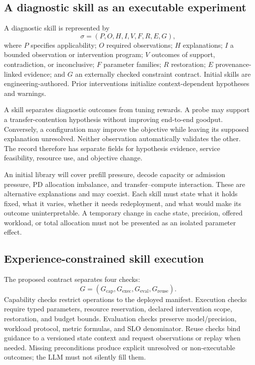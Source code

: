 \documentclass[preprint,12pt]{elsarticle}
\begin{document}
\subsection{A diagnostic skill as an executable experiment}
A diagnostic skill is represented by
\begin{equation}
 \sigma=(P,O,H,I,V,F,R,E,G),
\end{equation}
where $P$ specifies applicability; $O$ required observations; $H$ explanations; $I$ a bounded observation or intervention program; $V$ outcomes of support, contradiction, or inconclusive; $F$ parameter families; $R$ restoration; $E$ provenance-linked evidence; and $G$ an externally checked constraint contract. Initial skills are engineering-authored. Prior interventions initialize context-dependent hypotheses and warnings.

A skill separates diagnostic outcomes from tuning rewards. A probe may support a transfer-contention hypothesis without improving end-to-end goodput. Conversely, a configuration may improve the objective while leaving its supposed explanation unresolved. Neither observation automatically validates the other. The record therefore has separate fields for hypothesis evidence, service feasibility, resource use, and objective change.

An initial library will cover prefill pressure, decode capacity or admission pressure, PD allocation imbalance, and transfer--compute interaction. These are alternative explanations and may coexist. Each skill must state what it holds fixed, what it varies, whether it needs redeployment, and what would make its outcome uninterpretable. A temporary change in cache state, precision, offered workload, or total allocation must not be presented as an isolated parameter effect.

\subsection{Experience-constrained skill execution}
The proposed contract separates four checks:
\begin{equation}
 G=(G_{\mathrm{cap}},G_{\mathrm{exec}},G_{\mathrm{eval}},G_{\mathrm{reuse}}).
\end{equation}
Capability checks restrict operations to the deployed manifest. Execution checks require typed parameters, resource reservation, declared intervention scope, restoration, and budget bounds. Evaluation checks preserve model/precision, workload protocol, metric formulas, and SLO denominator. Reuse checks bind guidance to a versioned state context and request observations or replay when needed. Missing preconditions produce explicit unresolved or non-executable outcomes; the LLM must not silently fill them.
\end{document}
